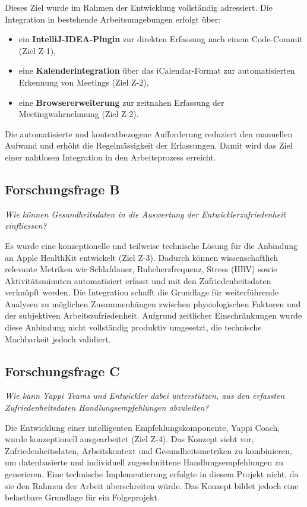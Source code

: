 \documentclass[12pt,a4paper]{report}
\begin{document}
    Dieses Ziel wurde im Rahmen der Entwicklung vollständig adressiert. Die Integration in bestehende Arbeitsumgebungen
    erfolgt über:
    \begin{itemize}
        \item ein \textbf{IntelliJ-IDEA-Plugin} zur direkten Erfassung nach einem Code-Commit (Ziel Z-1),
        \item eine \textbf{Kalenderintegration} über das iCalendar-Format zur automatisierten Erkennung von Meetings (Ziel Z-2),
        \item eine \textbf{Browsererweiterung} zur zeitnahen Erfassung der Meetingwahrnehmung (Ziel Z-2).
    \end{itemize}
    Die automatisierte und kontextbezogene Aufforderung reduziert den manuellen Aufwand und erhöht die Regelmässigkeit
    der Erfassungen. Damit wird das Ziel einer nahtlosen Integration in den Arbeitsprozess erreicht.

    \subsection*{Forschungsfrage B}
    \textit{Wie können Gesundheitsdaten in die Auswertung der Entwicklerzufriedenheit einfliessen?}

    Es wurde eine konzeptionelle und teilweise technische Lösung für die Anbindung an Apple HealthKit entwickelt
    (Ziel Z-3). Dadurch können wissenschaftlich relevante Metriken wie Schlafdauer, Ruheherzfrequenz, Stress (HRV) sowie
    Aktivitätsminuten automatisiert erfasst und mit den Zufriedenheitsdaten verknüpft werden.
    Die Integration schafft die Grundlage für weiterführende Analysen zu möglichen Zusammenhängen zwischen physiologischen
    Faktoren und der subjektiven Arbeitszufriedenheit. Aufgrund zeitlicher Einschränkungen wurde diese Anbindung nicht
    vollständig produktiv umgesetzt, die technische Machbarkeit jedoch validiert.

    \subsection*{Forschungsfrage C}
    \textit{Wie kann Yappi Teams und Entwickler dabei unterstützen, aus den erfassten Zufriedenheitsdaten
    Handlungsempfehlungen abzuleiten?}

    Die Entwicklung einer intelligenten Empfehlungskomponente, Yappi Coach, wurde konzeptionell ausgearbeitet
    (Ziel Z-4).
    Das Konzept sieht vor, Zufriedenheitsdaten, Arbeitskontext und Gesundheitsmetriken zu kombinieren, um datenbasierte
    und individuell zugeschnittene Handlungsempfehlungen zu generieren. Eine technische Implementierung erfolgte in diesem
    Projekt nicht, da sie den Rahmen der Arbeit überschreiten würde. Das Konzept bildet jedoch eine belastbare Grundlage
    für ein Folgeprojekt.
\end{document}
